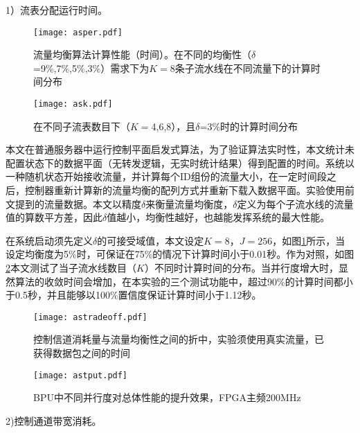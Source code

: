 1）流表分配运行时间。

\begin{figure}[!ht]
	\centering 
	\vspace{-1.5mm} 
	\texttt{[image: asper.pdf]}
	\caption{流量均衡算法计算性能（时间）。在不同的均衡性（$\delta$=9\%,7\%,5\%,3\%）需求下为$K=8$条子流水线在不同流量下的计算时间分布} \label{fig:asper}
\end{figure}

\begin{figure}[!ht]
	\centering 
	\vspace{-1.5mm} 
	\texttt{[image: ask.pdf]}
	\caption{在不同子流表数目下（$K=$4,6,8），且$\delta$=3\%时的计算时间分布} \label{fig:ask}
\end{figure}

本文在普通服务器中运行控制平面启发式算法，为了验证算法实时性，本文统计未配置状态下的数据平面（无转发逻辑，无实时统计结果）得到配置的时间。系统以一种随机状态开始接收流量，并计算每个ID组份的流量大小，在一定时间段之后，控制器重新计算新的流量均衡的配列方式并重新下载入数据平面。实验使用前文提到的流量数据。本文以精度$\delta$来衡量流量均衡度，$\delta$定义为每个子流水线的流量值的算数平方差，因此$\delta$值越小，均衡性越好，也越能发挥系统的最大性能。

在系统启动须先定义$\delta$的可接受域值，本文设定$K=8$，$ J=256$，如图\ref{fig:asper}所示，当设定均衡度为5\%时，可保证在75\%的情况下计算时间小于0.01秒。作为对照，如图\ref{fig:ask}本文测试了当子流水线数目（$K$）不同时计算时间的分布。当并行度增大时，显然算法的收敛时间会增加，在本实验的三个测试功能中，超过90\%的计算时间都小于0.5秒，并且能够以100\%置信度保证计算时间小于1.12秒。

\begin{figure}[htbp]
	\centering 
	\vspace{-1.5mm}
	\begin{minipage}[t]{0.48\textwidth}
		\centering
		\texttt{[image: astradeoff.pdf]}
		\caption{控制信道消耗量与流量均衡性之间的折中，实验须使用真实流量，已获得数据包之间的时间} \label{fig:astradeoff}
	\end{minipage}
	\begin{minipage}[t]{0.48\textwidth}
		\centering
		\texttt{[image: astput.pdf]}
		\caption{BPU中不同并行度对总体性能的提升效果，FPGA主频200MHz} \label{fig:astput}
	\end{minipage}
\end{figure}



2)控制通道带宽消耗。

